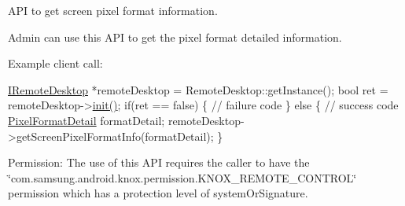 \-A\-P\-I to get screen pixel format information. 

\-Admin can use this \-A\-P\-I to get the pixel format detailed information. 

\-Example client call\-:


\begin{DoxyPre}
  \hyperlink{classknoxremotedesktop_1_1IRemoteDesktop}{IRemoteDesktop} *remoteDesktop = RemoteDesktop::getInstance();
  bool ret = remoteDesktop->\hyperlink{classknoxremotedesktop_1_1IRemoteDesktop_a7bed40d98c61713a69cf1dad8b37beae}{init()};
  if(ret == false)  \{
     // failure code
  \} else \{
     // success code
     \hyperlink{structknoxremotedesktop_1_1PixelFormatDetail}{PixelFormatDetail} formatDetail;
     remoteDesktop->getScreenPixelFormatInfo(formatDetail);
  \}
 \end{DoxyPre}


\begin{DoxyParagraph}{\-Permission\-: }
\-The use of this \-A\-P\-I requires the caller to have the \char`\"{}com.\-samsung.\-android.\-knox.\-permission.\-K\-N\-O\-X\-\_\-\-R\-E\-M\-O\-T\-E\-\_\-\-C\-O\-N\-T\-R\-O\-L\char`\"{} permission which has a protection level of system\-Or\-Signature.
\end{DoxyParagraph}

